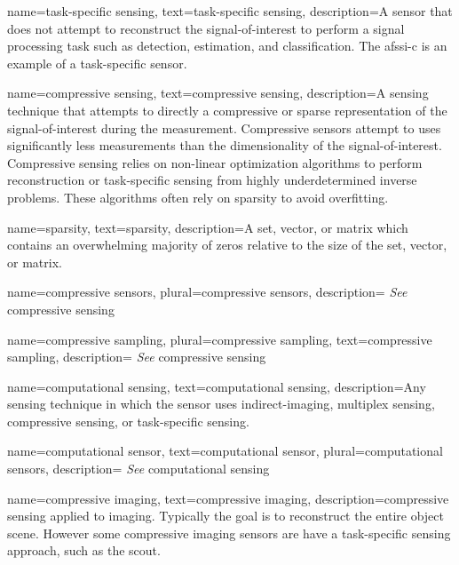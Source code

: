 {
name={task-specific sensing},
text={task-specific sensing},
description={A sensor that does not attempt to reconstruct the signal-of-interest to perform a signal processing task such as detection, estimation, and classification. The \gls{afssi-c} is an example of a task-specific sensor. }
}

{
name={compressive sensing},
text={compressive sensing},
description={A sensing technique that attempts to directly a compressive or sparse representation of the signal-of-interest during the measurement. Compressive sensors attempt to uses significantly less measurements than the dimensionality of the signal-of-interest. Compressive sensing relies on non-linear optimization algorithms to perform reconstruction or task-specific sensing from highly underdetermined inverse problems. These algorithms often rely on sparsity to avoid overfitting.}
}

{
name={sparsity},
text={sparsity},
description={A set, vector, or matrix which contains an overwhelming majority of zeros relative to the size of the set, vector, or matrix. }
}



{
name={compressive sensors},
plural={compressive sensors},
description={ \emph{See} \gls{compressive sensing}}
}

{
name={compressive sampling},
plural={compressive sampling},
text={compressive sampling},
description={ \emph{See} \gls{compressive sensing}}
}

{
name={computational sensing},
text={computational sensing},
description={Any sensing technique in which the sensor uses \gls{indirect-imaging}, \gls{multiplex sensing}, \gls{compressive sensing}, or \gls{task-specific sensing}.}
}

{
name={computational sensor},
text={computational sensor},
plural={computational sensors},
description={ \emph{See} \gls{computational sensing}}
}


{
name={compressive imaging},
text={compressive imaging},
description={\gls{compressive sensing} applied to imaging. Typically the goal is to reconstruct the entire object scene. However some compressive imaging sensors are have a task-specific sensing approach, such as the \gls{scout}.}
}

